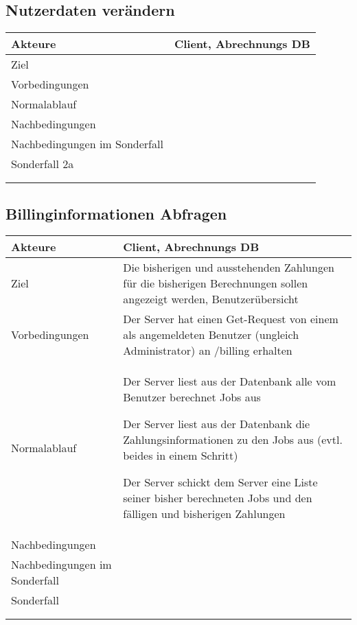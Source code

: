 \documentclass[a4paper,10pt,titlepage]{article}
\makeatletter
\newcommand\novspace{\@minipagetrue}
\newenvironment{owncompactitem}{%
\compactitem
}{%
\@finalstrut\@arstrutbox
\@nameuse{endcompactitem}%
\aftergroup\let\aftergroup\@finalstrut\aftergroup\@gobble
}
\newenvironment{owncompactenum}{%
\compactenum
}{%
\@finalstrut\@arstrutbox
\@nameuse{endcompactenum}%
\aftergroup\let\aftergroup\@finalstrut\aftergroup\@gobble
}
\newcommand{\usecase}[7]
{\subsection{#1}
\setlength{\extrarowheight}{2pt}
\begin{tabular}{|p{0.2\textwidth}|p{0.9\textwidth}|}
\hline
  Akteure & #2\\\hline
  Ziel & #3\\\hline
  Vorbedingungen & \novspace
  	\begin{owncompactitem}[-] #4 \end{owncompactitem} \\\hline
  Normalablauf & \vspace{-7pt}
  	\begin{owncompactenum}[1.] #6 \end{owncompactenum} \\\hline
  Nachbedingungen & \novspace
  	\begin{owncompactitem}[-] #5 \end{owncompactitem} \\\hline
  #7
\end{tabular}
}
\newcommand{\sonderfall}[4][\empty]
{
Sonderfall #2 & \vspace{-10pt}
	\textit{#3}
	\begin{owncompactenum}[{#2}.1] {#4} \end{owncompactenum}
  	\ifthenelse{\equal{#1}{\empty}}
    	{\\\hline} %
    	{\ensuremath{\rightarrow} #1 \\ [+1pt] \hline} %

}
\newcommand{\sondernachbedingung}[1]
{
Nachbedingungen im Sonderfall& \novspace
	\begin{owncompactitem}[-]
		#1
	\end{owncompactitem} \\\hline
}
\makeatother
\begin{document}
\usecase{Nutzerdaten verändern}{Client, Abrechnungs DB}%
{}%
{%
  \item
}
{%
  \item
}
{%
  \item
}
{%
  \sondernachbedingung{
	\item
	}
  \sonderfall[Panic]{2a}%
	  {}%
	  {
	  \item .
	  }
}


\usecase{Billinginformationen Abfragen}{Client, Abrechnungs DB}%
{Die bisherigen und ausstehenden Zahlungen für die bisherigen Berechnungen sollen angezeigt werden, Benutzerübersicht}%
{%
  \item Der Server hat einen Get-Request von einem als angemeldeten Benutzer (ungleich Administrator) an /billing erhalten
}
{%
  \item 
}
{%
  \item Der Server liest aus der Datenbank alle vom Benutzer berechnet Jobs aus
  \item Der Server liest aus der Datenbank die Zahlungsinformationen zu den Jobs aus (evtl. beides in einem Schritt)
  \item Der Server schickt dem Server eine Liste seiner bisher berechneten Jobs und den fälligen und bisherigen Zahlungen
}
{%
  \sondernachbedingung{
	\item 
	}
  \sonderfall[]{}%
	  {}%
	  {
	  \item
	  }
}

\end{document}

